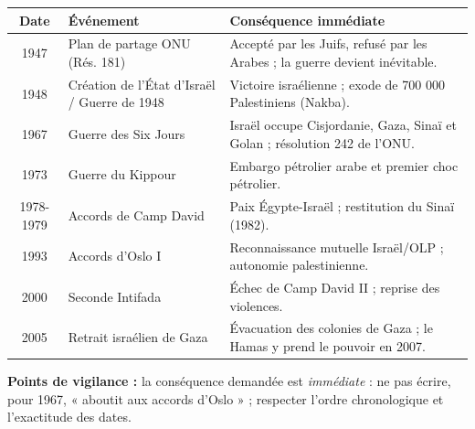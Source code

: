 \documentclass[11pt]{article}
\begin{document}
\begin{corrige}
\begin{center}
\begin{tabularx}{\linewidth}{|c|X|X|}\hline
\textbf{Date} & \textbf{Événement} & \textbf{Conséquence immédiate} \\ \hline
1947 & Plan de partage ONU (Rés. 181) & Accepté par les Juifs, refusé par les Arabes ; la guerre devient inévitable. \\ \hline
1948 & Création de l'État d'Israël / Guerre de 1948 & Victoire israélienne ; exode de 700 000 Palestiniens (Nakba). \\ \hline
1967 & Guerre des Six Jours & Israël occupe Cisjordanie, Gaza, Sinaï et Golan ; résolution 242 de l'ONU. \\ \hline
1973 & Guerre du Kippour & Embargo pétrolier arabe et premier choc pétrolier. \\ \hline
1978-1979 & Accords de Camp David & Paix Égypte-Israël ; restitution du Sinaï (1982). \\ \hline
1993 & Accords d'Oslo I & Reconnaissance mutuelle Israël/OLP ; autonomie palestinienne. \\ \hline
2000 & Seconde Intifada & Échec de Camp David II ; reprise des violences. \\ \hline
2005 & Retrait israélien de Gaza & Évacuation des colonies de Gaza ; le Hamas y prend le pouvoir en 2007. \\ \hline
\end{tabularx}
\end{center}
\textbf{Points de vigilance :} la conséquence demandée est \emph{immédiate} : ne pas écrire, pour 1967, « aboutit aux accords d'Oslo » ; respecter l'ordre chronologique et l'exactitude des dates.
\end{corrige}
\end{document}
